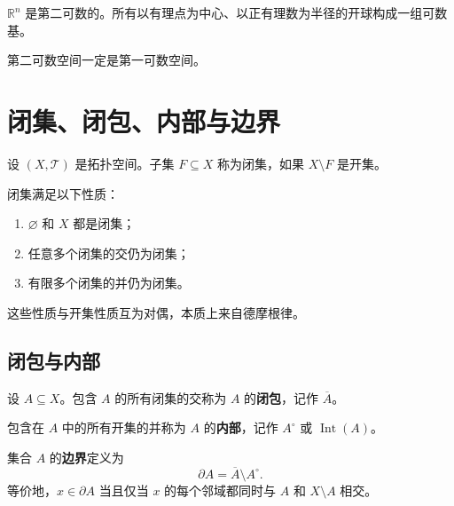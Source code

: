 \begin{example}
$\mathbb{R}^n$ 是第二可数的。所有以有理点为中心、以正有理数为半径的开球构成一组可数基。
\end{example}

\begin{proposition}
第二可数空间一定是第一可数空间。
\end{proposition}

\section{闭集、闭包、内部与边界}

\begin{definition}[闭集]
设 $(X,\mathcal{T})$ 是拓扑空间。子集 $F\subseteq X$ 称为闭集，如果 $X\setminus F$ 是开集。
\end{definition}

\begin{proposition}[闭集的性质]
闭集满足以下性质：
\begin{enumerate}
    \item $\varnothing$ 和 $X$ 都是闭集；
    \item 任意多个闭集的交仍为闭集；
    \item 有限多个闭集的并仍为闭集。
\end{enumerate}
\end{proposition}

这些性质与开集性质互为对偶，本质上来自德摩根律。

\subsection{闭包与内部}

\begin{definition}[闭包]
设 $A\subseteq X$。包含 $A$ 的所有闭集的交称为 $A$ 的\textbf{闭包}，记作 $\overline{A}$。
\end{definition}

\begin{definition}[内部]
包含在 $A$ 中的所有开集的并称为 $A$ 的\textbf{内部}，记作 $A^\circ$ 或 $\operatorname{Int}(A)$。
\end{definition}

\begin{definition}[边界]
集合 $A$ 的\textbf{边界}定义为
\[
    \partial A=\overline{A}\setminus A^\circ.
\]
等价地，$x\in\partial A$ 当且仅当 $x$ 的每个邻域都同时与 $A$ 和 $X\setminus A$ 相交。
\end{definition}

